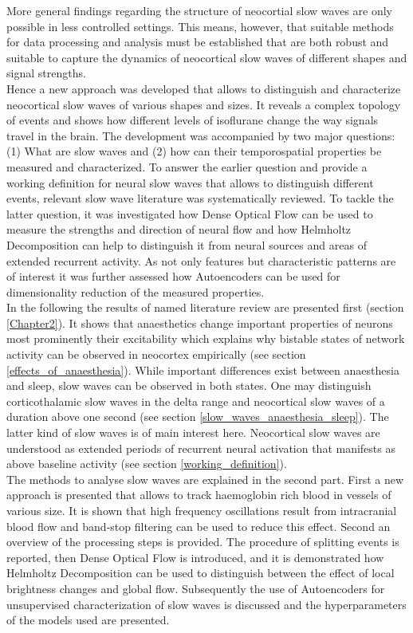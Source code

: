More general findings regarding the structure of neocortial slow waves are only possible in less controlled settings. This means, however, that suitable methods for data processing and analysis must be established that are both robust and suitable to capture the dynamics of neocortical slow waves of different shapes and signal strengths.\\
Hence a new approach was developed that allows to distinguish and characterize neocortical slow waves of various shapes and sizes. It reveals a complex topology of events and shows how different levels of isoflurane change the way signals travel in the brain. The development was accompanied by two major questions: (1) What are slow waves and (2) how can their temporospatial properties be measured and characterized. To answer the earlier question and provide a working definition for neural slow waves that allows to distinguish different events, relevant slow wave literature was systematically reviewed. To tackle the latter question, it was investigated how Dense Optical Flow can be used to measure the strengths and direction of neural flow and how Helmholtz Decomposition can help to distinguish it from neural sources and areas of extended recurrent activity. As not only features but characteristic patterns are of interest it was further assessed how Autoencoders can be used for dimensionality reduction of the measured properties.\\
In the following the results of named literature review are presented first (section \ref{Chapter2}). It shows that anaesthetics change important properties of neurons most prominently their excitability which explains why bistable states of network activity can be observed in neocortex empirically (see section \ref{effects_of_anaesthesia}). While important differences exist between anaesthesia and sleep, slow waves can be observed in both states. One may distinguish corticothalamic slow waves in the delta range and neocortical slow waves of a duration above one second (see section \ref{slow_waves_anaesthesia_sleep}). The latter kind of slow waves is of main interest here. Neocortical slow waves are understood as extended periods of recurrent neural activation that manifests as above baseline activity (see section \ref{working_definition}). \\
The methods to analyse slow waves are explained in the second part. First a new approach is presented that allows to track haemoglobin rich blood in vessels of various size. It is shown that high frequency oscillations result from intracranial blood flow and band-stop filtering can be used to reduce this effect. Second an overview of the processing steps is provided. The procedure of splitting events is reported, then Dense Optical Flow is introduced, and it is demonstrated how Helmholtz Decomposition can be used to distinguish between the effect of local brightness changes and global flow. Subsequently the use of Autoencoders for unsupervised characterization of slow waves is discussed and the hyperparameters of the models used are presented. \\
